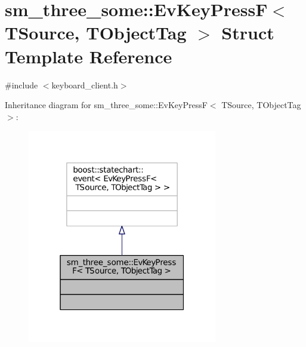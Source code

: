 \hypertarget{structsm__three__some_1_1EvKeyPressF}{}\section{sm\+\_\+three\+\_\+some\+:\+:Ev\+Key\+PressF$<$ T\+Source, T\+Object\+Tag $>$ Struct Template Reference}
\label{structsm__three__some_1_1EvKeyPressF}


{\ttfamily \#include $<$keyboard\+\_\+client.\+h$>$}



Inheritance diagram for sm\+\_\+three\+\_\+some\+:\+:Ev\+Key\+PressF$<$ T\+Source, T\+Object\+Tag $>$\+:
\nopagebreak
\begin{figure}[H]
\begin{center}
\leavevmode
\includegraphics[width=235pt]{structsm__three__some_1_1EvKeyPressF__inherit__graph}
\end{center}
\end{figure}



